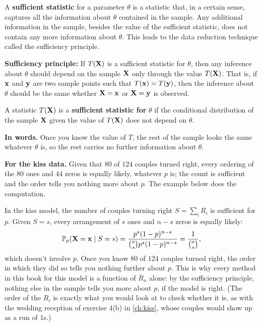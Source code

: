 A \textbf{sufficient statistic} for a parameter $\theta$ is a statistic that, in a certain sense, captures all the information about $\theta$ contained in the sample.
Any additional information in the sample, besides the value of the sufficient statistic, does not contain any more information about $\theta$.
This leads to the data reduction technique called the sufficiency principle.

\textbf{Sufficiency principle:} If $T(\mathbf{X})$ is a sufficient statistic for $\theta$, then any inference about $\theta$ should depend on the sample $\mathbf{X}$ only through the value $T(\mathbf{X})$.
That is, if $\mathbf{x}$ and $\mathbf{y}$ are two sample points such that $T(\mathbf{x}) = T(\mathbf{y})$, then the inference about $\theta$ should be the same whether $\mathbf{X} = \mathbf{x}$ or $\mathbf{X} = \mathbf{y}$ is observed.

\begin{definition}
\label{def:sufficient}
A statistic $T(\mathbf{X})$ is a \textbf{sufficient statistic for} $\theta$ if the conditional distribution of the sample $\mathbf{X}$ given the value of $T(\mathbf{X})$ does not depend on $\theta$.
\end{definition}

\begin{inwords}
\textbf{In words.} Once you know the value of $T$, the rest of the sample looks the same whatever $\theta$ is, so the rest carries no further information about $\theta$.
\par\smallskip
\textbf{For the kiss data.} Given that $80$ of $124$ couples turned right, every ordering of the $80$ ones and $44$ zeros is equally likely, whatever $p$ is; the count is sufficient and the order tells you nothing more about $p$. The example below does the computation.
\end{inwords}

\begin{example}
\label{ex:sufficient-bernoulli}
In the kiss model, the number of couples turning right $S = \sum_i R_i$ is sufficient for $p$.
Given $S = s$, every arrangement of $s$ ones and $n - s$ zeros is equally likely:
\[
\mathbb{P}_p(\mathbf{X} = \mathbf{x} \mid S = s) = \frac{p^s (1-p)^{n-s}}{\binom{n}{s} p^s (1-p)^{n-s}} = \frac{1}{\binom{n}{s}},
\]
which doesn't involve $p$.
Once you know $80$ of $124$ couples turned right, the order in which they did so tells you nothing further about $p$.
This is why every method in this book for this model is a function of $\bar{R}_n$ alone: by the sufficiency principle, nothing else in the sample tells you more about $p$, if the model is right. (The order of the $R_i$ is exactly what you would look at to check whether it is, as with the wedding reception of exercise 4(b) in \cref{ch:kiss}, whose couples would show up as a run of $1$s.)
\end{example}

